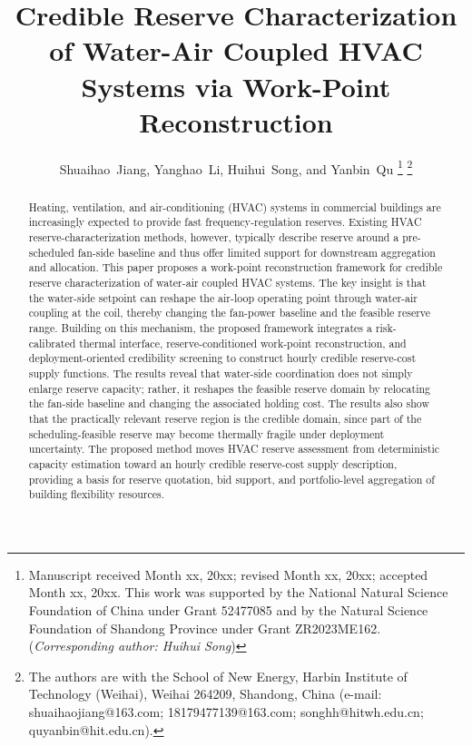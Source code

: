\documentclass[journal]{IEEEtran}
\theoremstyle{remark}
\begin{document}
\nolinenumbers
\title{Credible Reserve Characterization of Water-Air Coupled HVAC Systems via Work-Point Reconstruction}




\author{Shuaihao~Jiang,
Yanghao~Li,
Huihui~Song,
and Yanbin~Qu%
\thanks{Manuscript received Month xx, 20xx; revised Month xx, 20xx; accepted Month xx, 20xx. This work was supported by the National Natural Science Foundation of China under Grant 52477085 and by the Natural Science Foundation of Shandong Province under Grant ZR2023ME162. (\textit{Corresponding author: Huihui Song})}%
\thanks{The authors are with the School of New Energy, Harbin Institute of Technology (Weihai), Weihai 264209, Shandong, China (e-mail: shuaihaojiang@163.com; 18179477139@163.com; songhh@hitwh.edu.cn; quyanbin@hit.edu.cn).}%
}




\maketitle

\begin{abstract}
Heating, ventilation, and air-conditioning (HVAC) systems in commercial buildings are increasingly expected to provide fast frequency-regulation reserves. Existing HVAC reserve-characterization methods, however, typically describe reserve around a pre-scheduled fan-side baseline and thus offer limited support for downstream aggregation and allocation. This paper proposes a work-point reconstruction framework for credible reserve characterization of water-air coupled HVAC systems. The key insight is that the water-side setpoint can reshape the air-loop operating point through water-air coupling at the coil, thereby changing the fan-power baseline and the feasible reserve range. Building on this mechanism, the proposed framework integrates a risk-calibrated thermal interface, reserve-conditioned work-point reconstruction, and deployment-oriented credibility screening to construct hourly credible reserve-cost supply functions. The results reveal that water-side coordination does not simply enlarge reserve capacity; rather, it reshapes the feasible reserve domain by relocating the fan-side baseline and changing the associated holding cost. The results also show that the practically relevant reserve region is the credible domain, since part of the scheduling-feasible reserve may become thermally fragile under deployment uncertainty. The proposed method moves HVAC reserve assessment from deterministic capacity estimation toward an hourly credible reserve-cost supply description, providing a basis for reserve quotation, bid support, and portfolio-level aggregation of building flexibility resources.
\end{abstract}
\end{document}
